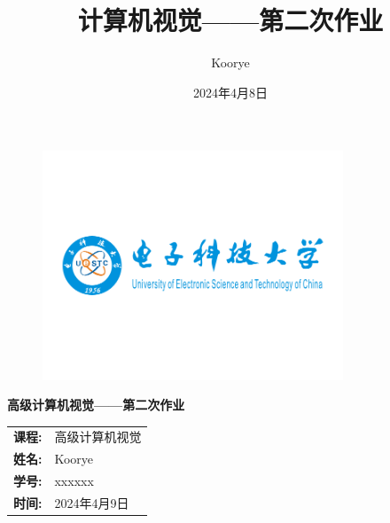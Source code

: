 \documentclass{article}
\title{计算机视觉——第二次作业}
\author{Koorye}
\date{2024年4月8日}
\begin{document}

\thispagestyle{empty}

\begin{figure}[t]
    \centering
    \includegraphics[width=0.8\textwidth]{images/logo.png}
\end{figure}

\vspace*{\fill}
    \begin{center}
        \huge\textbf{高级计算机视觉——第二次作业}
    \end{center}
\vspace*{\fill}

\begin{table}[b]
    \centering
    \large
    \begin{tabular}{ll}
    \textbf{课程:} & 高级计算机视觉 \\
    \textbf{姓名:} & Koorye \\
    \textbf{学号:} & xxxxxx \\
    \textbf{时间:} & 2024年4月9日 \\
    \end{tabular}
\end{table}

\newpage
\tableofcontents

\newpage










\newpage

\end{document}
